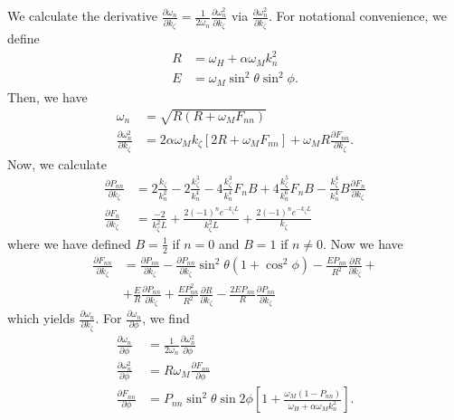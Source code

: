 \documentclass{article}
\begin{document}
We calculate the derivative $\frac{\partial \omega_{n}}{\partial k_{\zeta}} = \frac{1}{2 \omega_{n}} \frac{\partial \omega_{n}^2}{\partial k_{\zeta}}$ via $\frac{\partial \omega_{n}^2}{\partial k_{\zeta}}$. For notational convenience, we define 
\begin{align}
R &= \omega_{H} + \alpha \omega_{M} k_{n}^2 \\
E &= \omega_{M} \sin^2{\theta} \sin^2{\phi}.
\end{align}
Then, we have
\begin{align}
\omega_{n} &= \sqrt{R(R + \omega_{M} F_{nn})} \\
\frac{\partial \omega_{n}^2}{\partial k_{\zeta}} &= 2  \alpha \omega_{M} k_{\zeta} \left[2R + \omega_{M} F_{nn} \right] + \omega_{M} R \frac{\partial F_{nn}}{\partial k_{\zeta}}.
\end{align}
Now, we calculate
\begin{align}
\frac{\partial P_{nn}}{\partial k_{\zeta}} &= 2 \frac{k_{\zeta}}{k_{n}^{2}} - 2 \frac{k_{\zeta}^3}{k_{n}^{4}} - 4 \frac{k_{\zeta}^3}{k_{n}^{4}}   F_{n} B + 4 \frac{k_{\zeta}^5}{k_{n}^{6}} F_{n} B - \frac{k_{\zeta}^4}{k_{n}^{4}} B \frac{\partial F_{n}}{\partial k_{\zeta}} \\
\frac{\partial F_{n}}{\partial k_{\zeta}} &= \frac{-2}{k_{\zeta}^2 L} + \frac{2 (-1)^n e^{-k_{\zeta} L}}{k_{\zeta}^2 L} + \frac{2 (-1)^n e^{-k_{\zeta} L}}{k_{\zeta}}
\end{align}
where we have defined $B = \frac{1}{2}$ if $n=0$ and $B=1$ if $n \neq 0$.
Now we have
\begin{align}
\frac{\partial F_{nn}}{\partial k_{\zeta}} &= \frac{\partial P_{nn}}{\partial k_{\zeta}} - \frac{\partial P_{nn}}{\partial k_{\zeta}} \sin^2{\theta} (1 + \cos^2{\phi}) - \frac{E P_{nn}}{R^2} \frac{\partial R}{\partial k_{\zeta}} + \\
&+ \frac{E}{R} \frac{\partial P_{nn}}{\partial k_{\zeta}}  + \frac{E P_{nn}^2}{R^2} \frac{\partial R}{\partial k_{\zeta}} - \frac{2 E P_{nn}}{R} \frac{\partial P_{nn}}{\partial k_{\zeta}} \nonumber
\end{align}
which yields $\frac{\partial \omega_{n}}{\partial k_{\zeta}}$. For $\frac{\partial \omega_{n}}{\partial \phi}$, we find
\begin{align}
\frac{\partial \omega_{n}}{\partial \phi} &= \frac{1}{2 \omega_{n}} \frac{\partial \omega_{n}^2}{\partial \phi} \\
\frac{\partial \omega_{n}^2}{\partial \phi} &= R \omega_{M} \frac{\partial F_{nn}}{\partial \phi} \\
\frac{\partial F_{nn}}{\partial \phi} &= P_{nn} \sin^2{\theta} \sin{2\phi} \left[ 1 + \frac{\omega_{M} (1 - P_{nn})}{\omega_{H} + \alpha \omega_{M} k_{n}^2} \right].
\end{align}
\end{document}
